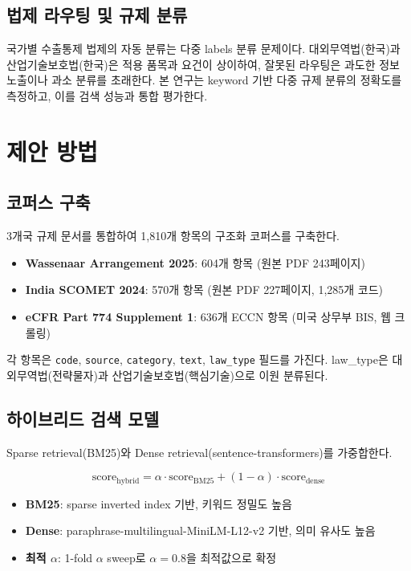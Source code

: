 \documentclass[11pt,a4paper]{article}
\begin{document}
\subsection{법제 라우팅 및 규제 분류}
국가별 수출통제 법제의 자동 분류는 다중 labels 분류 문제이다. 대외무역법(한국)과 산업기술보호법(한국)은 적용 품목과 요건이 상이하여, 잘못된 라우팅은 과도한 정보 노출이나 과소 분류를 초래한다. 본 연구는 keyword 기반 다중 규제 분류의 정확도를 측정하고, 이를 검색 성능과 통합 평가한다.

\section{제안 방법}
\label{sec:method}

\subsection{코퍼스 구축}
3개국 규제 문서를 통합하여 1,810개 항목의 구조화 코퍼스를 구축한다.

\begin{itemize}
\item \textbf{Wassenaar Arrangement 2025}: 604개 항목 (원본 PDF 243페이지)
\item \textbf{India SCOMET 2024}: 570개 항목 (원본 PDF 227페이지, 1,285개 코드)
\item \textbf{eCFR Part 774 Supplement 1}: 636개 ECCN 항목 (미국 상무부 BIS, 웹 크롤링)
\end{itemize}

각 항목은 \texttt{code}, \texttt{source}, \texttt{category}, \texttt{text}, \texttt{law\_type} 필드를 가진다. law\_type은 대외무역법(전략물자)과 산업기술보호법(핵심기술)으로 이원 분류된다.

\subsection{하이브리드 검색 모델}
Sparse retrieval(BM25)와 Dense retrieval(sentence-transformers)를 가중합한다.

\[
\text{score}_{\text{hybrid}} = \alpha \cdot \text{score}_{\text{BM25}} + (1-\alpha) \cdot \text{score}_{\text{dense}}
\]

\begin{itemize}
\item \textbf{BM25}: sparse inverted index 기반, 키워드 정밀도 높음
\item \textbf{Dense}: paraphrase-multilingual-MiniLM-L12-v2 기반, 의미 유사도 높음
\item \textbf{최적 $\alpha$}: 1-fold $\alpha$ sweep로 $\alpha=0.8$을 최적값으로 확정
\end{itemize}
\end{document}
